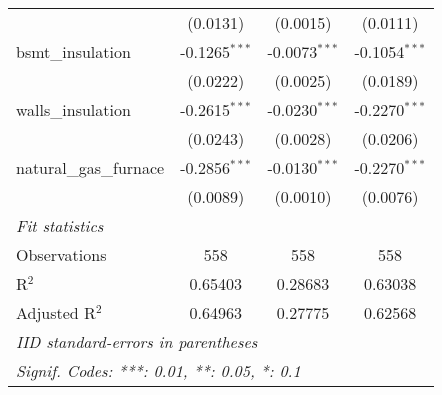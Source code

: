 \begin{tabular}{lccc}
                           & (0.0131)                                                                 & (0.0015)                                                                    & (0.0111)\\
   bsmt\_insulation       & -0.1265$^{***}$                                                          & -0.0073$^{***}$                                                             & -0.1054$^{***}$\\
                           & (0.0222)                                                                 & (0.0025)                                                                    & (0.0189)\\
   walls\_insulation      & -0.2615$^{***}$                                                          & -0.0230$^{***}$                                                             & -0.2270$^{***}$\\
                           & (0.0243)                                                                 & (0.0028)                                                                    & (0.0206)\\
   natural\_gas\_furnace & -0.2856$^{***}$                                                          & -0.0130$^{***}$                                                             & -0.2270$^{***}$\\
                           & (0.0089)                                                                 & (0.0010)                                                                    & (0.0076)\\
   \midrule \emph{Fit statistics} &   &   &  \\
   Observations            & 558                                                                      & 558                                                                         & 558\\
   R$^2$                   & 0.65403                                                                  & 0.28683                                                                     & 0.63038\\
   Adjusted R$^2$          & 0.64963                                                                  & 0.27775                                                                     & 0.62568\\
   \midrule\midrule\multicolumn{4}{l}{\emph{IID standard-errors in parentheses}}\\
   \multicolumn{4}{l}{\emph{Signif. Codes: ***: 0.01, **: 0.05, *: 0.1}}\\
\end{tabular}




